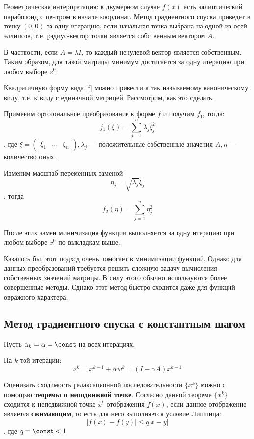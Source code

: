 Геометрическая интерпретация: в двумерном случае \(f(x)\) есть эллиптический параболоид с центром в начале координат. Метод градиентного спуска приведет в точку \((0, 0)\) за одну итерацию, если начальная точка выбрана на одной из осей эллипсов, т.е. радиус-вектор точки является собственным вектором \(A\).

В частности, если \(A = \lambda I\), то каждый ненулевой вектор является собственным. Таким образом, для такой матрицы минимум достигается за одну итерацию при любом выборе \(x^0\).

Квадратичную форму вида \eqref{f} можно привести к так называемому каноническому виду, т.е. к виду с единичной матрицей. Рассмотрим, как это сделать.

Применим ортогональное преобразование к форме \(f\) и получим \(f_1\), тогда:
\[f_1 (\xi) = \sum_{j = 1}^n \lambda_j \xi_j^2\]
, где \(\xi = \begin{pmatrix} \xi_1 & \dots & \xi_n \end{pmatrix}, \lambda_j\) --- положительные собственные значения \(A, n\) --- количество оных.

Изменим масштаб переменных заменой
\[\eta_j = \sqrt{\lambda_j} \xi_j\]
, тогда
\[f_2(\eta) = \sum_{j = 1}^n \eta_j^2\]

После этих замен минимизация функции выполняется за одну итерацию при любом выборе \(x^0\) по выкладкам выше.

Казалось бы, этот подход очень помогает в минимизации функций. Однако для данных преобразований требуется решить сложную задачу вычисления собственных значений матрицы. В силу этого обычно используются более совершенные методы. Однако этот метод быстро сходится даже для функций овражного характера.

\subsection{Метод градиентного спуска с константным шагом}

Пусть \(\alpha_k = \alpha = \const\) на всех итерациях.

На \(k\)-той итерации:
\begin{equation}
    x^k = x^{k - 1} + \alpha w^k = (I - \alpha A) x^{k - 1}
    \label{переход}
\end{equation}

Оценивать сходимость релаксационной последовательности \(\{x^k\}\) можно с помощью \textbf{теоремы о неподвижной точке}. Согласно данной теореме \(\{x^k\}\) сходится к неподвижной точке \(x^*\) отображения \(f(x)\), если данное отображение является \textbf{сжимающим}, то есть для него выполняется условие Липшица:
\begin{equation}
    |f(x) - f(y)| \leq q |x - y|
    \label{условие Липшица}
\end{equation}
, где \(q = \const < 1\)


